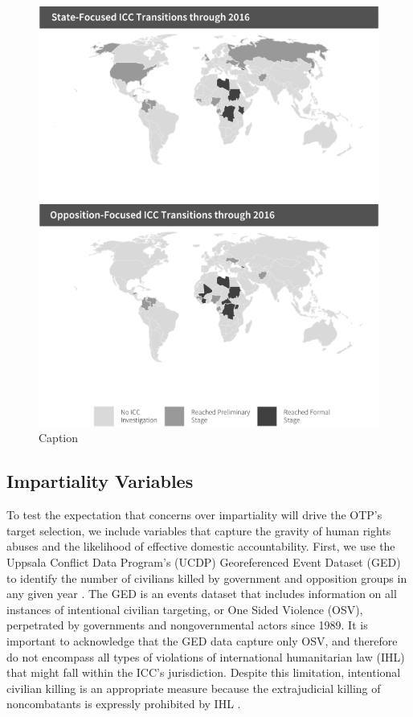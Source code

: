 \begin{figure}
    \centering
    \includegraphics[width=1\textwidth]{iccMaps.pdf}
    \caption{Caption}
    \label{fig:iccMaps}
\end{figure}
\FloatBarrier

\subsection*{Impartiality Variables}

To test the expectation that concerns over impartiality will drive the OTP's target selection, we include variables that capture the gravity of human rights abuses and the likelihood of effective domestic accountability. First, we use the Uppsala Conflict Data Program's (UCDP) Georeferenced Event Dataset (GED) to identify the number of civilians killed by government and opposition groups in any given year \citep{sundberg2013introducing}. The GED is an events dataset that includes information on all instances of intentional civilian targeting, or One Sided Violence (OSV), perpetrated by governments and nongovernmental actors since 1989. It is important to acknowledge that the GED data capture only OSV, and therefore do not encompass all types of violations of international humanitarian law (IHL) that might fall within the ICC's jurisdiction. Despite this limitation, intentional civilian killing is an appropriate measure because the extrajudicial killing of noncombatants is expressly prohibited by IHL \citep{blank2018international}.

